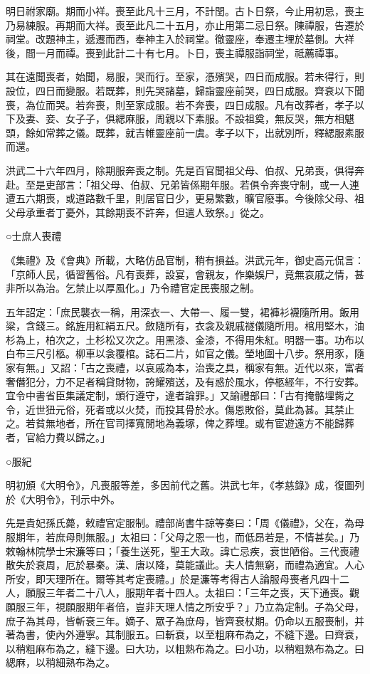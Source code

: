 明日祔家廟。期而小祥。喪至此凡十三月，不計閏。古卜日祭，今止用初忌，喪主乃易練服。再期而大祥。喪至此凡二十五月，亦止用第二忌日祭。陳禫服，告遷於祠堂。改題神主，遞遷而西，奉神主入於祠堂。徹靈座，奉遷主埋於墓側。大祥後，間一月而禫。喪到此計二十有七月。卜日，喪主禫服詣祠堂，祗薦禫事。

其在遠聞喪者，始聞，易服，哭而行。至家，憑殯哭，四日而成服。若未得行，則設位，四日而變服。若既葬，則先哭諸墓，歸詣靈座前哭，四日成服。齊衰以下聞喪，為位而哭。若奔喪，則至家成服。若不奔喪，四日成服。凡有改葬者，孝子以下及妻、妾、女子子，俱緦麻服，周親以下素服。不設祖奠，無反哭，無方相魌頭，餘如常葬之儀。既葬，就吉帷靈座前一虞。孝子以下，出就別所，釋緦服素服而還。

洪武二十六年四月，除期服奔喪之制。先是百官聞祖父母、伯叔、兄弟喪，俱得奔赴。至是吏部言：「祖父母、伯叔、兄弟皆係期年服。若俱令奔喪守制，或一人連遭五六期喪，或道路數千里，則居官日少，更易繁數，曠官廢事。今後除父母、祖父母承重者丁憂外，其餘期喪不許奔，但遣人致祭。」從之。

○士庶人喪禮

《集禮》及《會典》所載，大略仿品官制，稍有損益。洪武元年，御史高元侃言：「京師人民，循習舊俗。凡有喪葬，設宴，會親友，作樂娛尸，竟無哀戚之情，甚非所以為治。乞禁止以厚風化。」乃令禮官定民喪服之制。

五年詔定：「庶民襲衣一稱，用深衣一、大帶一、履一雙，裙褲衫襪隨所用。飯用粱，含錢三。銘旌用紅絹五尺。斂隨所有，衣衾及親戚禭儀隨所用。棺用堅木，油杉為上，柏次之，土杉松又次之。用黑漆、金漆，不得用朱紅。明器一事。功布以白布三尺引柩。柳車以衾覆棺。誌石二片，如官之儀。塋地圍十八步。祭用豕，隨家有無。」又詔：「古之喪禮，以哀戚為本，治喪之具，稱家有無。近代以來，富者奢僭犯分，力不足者稱貸財物，誇耀殯送，及有惑於風水，停柩經年，不行安葬。宜令中書省臣集議定制，頒行遵守，違者論罪。」又諭禮部曰：「古有掩骼埋胔之令，近世狃元俗，死者或以火焚，而投其骨於水。傷恩敗俗，莫此為甚。其禁止之。若貧無地者，所在官司擇寬閒地為義塚，俾之葬埋。或有宦遊遠方不能歸葬者，官給力費以歸之。」

○服紀

明初頒《大明令》，凡喪服等差，多因前代之舊。洪武七年，《孝慈錄》成，復圖列於《大明令》，刊示中外。

先是貴妃孫氏薨，敕禮官定服制。禮部尚書牛諒等奏曰：「周《儀禮》，父在，為母服期年，若庶母則無服。」太祖曰：「父母之恩一也，而低昂若是，不情甚矣。」乃敕翰林院學士宋濂等曰；「養生送死，聖王大政。諱亡忌疾，衰世陋俗。三代喪禮散失於衰周，厄於暴秦。漢、唐以降，莫能議此。夫人情無窮，而禮為適宜。人心所安，即天理所在。爾等其考定喪禮。」於是濂等考得古人論服母喪者凡四十二人，願服三年者二十八人，服期年者十四人。太祖曰：「三年之喪，天下通喪。觀願服三年，視願服期年者倍，豈非天理人情之所安乎？」乃立為定制。子為父母，庶子為其母，皆斬衰三年。嫡子、眾子為庶母，皆齊衰杖期。仍命以五服喪制，并著為書，使內外遵寧。其制服五。曰斬衰，以至粗麻布為之，不縫下邊。曰齊衰，以稍粗麻布為之，縫下邊。曰大功，以粗熟布為之。曰小功，以稍粗熟布為之。曰緦麻，以稍細熟布為之。

